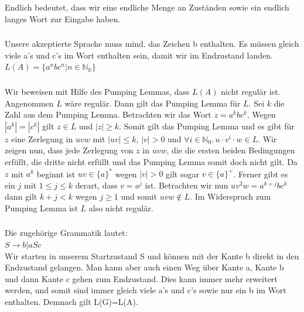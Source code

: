 \documentclass[a4paper,12pt]{scrartcl}
\title{\blatt}
\date{Gruppe 06}
\author{Sabrina Buczko 6663234, Julian Deinert 6535880, Rafael Heid 6704828}
\begin{document}
\maketitle
\newpage
\setcounter{section}{0}

\section{}
\setcounter{subsection}{3}
\subsection{}
\subsubsection{}
Endlich bedeutet, dass wir eine endliche Menge an Zuständen sowie ein endlich langes Wort zur Eingabe haben.
\subsubsection{}
Unsere akzeptierte Sprache muss mind. das Zeichen b enthalten. Es müssen gleich viele a's und c's im Wort enthalten sein, damit wir im Endzustand landen.\\
$L(A)=\{a^{n}bc^{n} | n\in \mathds{N_{0}}\}$
\subsubsection{}
Wir beweisen mit Hilfe des Pumping Lemmas, dass $L(A)$ nicht regulär ist.\\
Angenommen $L$ wäre regulär. Dann gilt das Pumping Lemma für $L$. Sei $k$ die Zahl aus dem Pumping Lemma. Betrachten wir das Wort $z=a^kbc^k$. Wegen $|a^k| = |c^k|$ gilt $z \in L$ und $|z|\geq k$. Somit gilt das Pumping Lemma und es gibt für $z$ eine Zerlegung in $uvw$ mit $|uv|\leq k$, $|v|> 0$ und $\forall i\in \mathbb{N}_0.\, u\cdot v^i\cdot w \in L$. Wir zeigen nun, dass jede Zerlegung von $z$ in $uvw$, die die ersten beiden Bedingungen erfüllt, die dritte nicht erfüllt und das Pumping Lemma somit doch nicht gilt. Da $z$ mit $a^k$ beginnt ist $uv \in \{a\}^*$ wegen $|v|> 0$ gilt sogar $v \in \{a\}^+$. Ferner gibt es ein $j$ mit $1 \leq j \leq k$ derart, dass  $v = a^j$ ist. Betrachten wir nun $uv^2w = a^{k+j}bc^k$ dann gilt $k+j < k$ wegen $j \geq 1$ und somit $uvw \notin L$. Im Widerspruch zum Pumping Lemma ist $L$ also nicht regulär. 
\subsubsection{}
Die zugehörige Grammatik lautet:\\
$S\rightarrow b | aSc$\\
Wir starten in unserem Startzustand S und können mit der Kante b direkt in den Endzustand gelangen. Man kann aber auch einen Weg über Kante a, Kante b und dann Kante c gehen zum Endzustand. Dies kann immer mehr erweitert werden, und somit sind immer gleich viele a's und c's sowie nur ein b im Wort enthalten. Demnach gilt L(G)=L(A).
\end{document}
